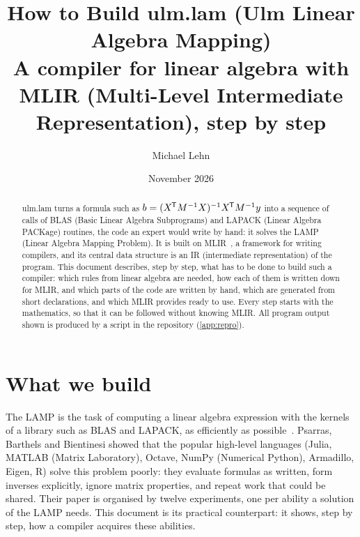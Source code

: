 \documentclass[11pt,a4paper]{article}
\title{How to Build ulm.lam (Ulm Linear Algebra Mapping)\\[0.3ex]
  \large A compiler for linear algebra with MLIR (Multi-Level Intermediate
  Representation), step by step}
\author{Michael Lehn}
\date{November 2026}
\newcommand{\T}{^{\mkern-1.5mu\mathsf{T}}}
\newcommand{\inv}{^{-1}}
\begin{document}
\maketitle

\begin{abstract}
\noindent
ulm.lam turns a formula such as
\(b=(X\T M\inv X)\inv X\T M\inv y\) into a sequence of calls of BLAS
(Basic Linear Algebra Subprograms) and LAPACK (Linear Algebra PACKage)
routines, the code an expert would write by hand: it solves the LAMP
(Linear Algebra Mapping Problem). It is built on MLIR~\cite{mlir}, a framework for
writing compilers, and its central data structure is an IR (intermediate
representation) of the program. This document describes, step by step, what has to be done to
build such a compiler: which rules from linear algebra are needed, how each
of them is written down for MLIR, and which parts of the code are written by
hand, which are generated from short declarations, and which MLIR provides
ready to use. Every step starts with the mathematics, so that it can be
followed without knowing MLIR. All program output shown is produced by a
script in the repository (\cref{app:repro}).
\end{abstract}

\tableofcontents

\section*{What we build}
\label{sec:intro}

The LAMP is the task of computing a
linear algebra expression with the kernels of a library such as BLAS and
LAPACK, as efficiently as possible~\cite{lamp}. Psarras, Barthels and
Bientinesi showed that the popular high-level languages (Julia, MATLAB
(Matrix Laboratory), Octave, NumPy (Numerical Python), Armadillo, Eigen,
R) solve
this problem poorly: they evaluate formulas as written, form inverses
explicitly, ignore matrix properties, and repeat work that could be shared.
Their paper is organised by twelve experiments, one per ability a solution
of the LAMP needs. This document is its practical counterpart: it shows,
step by step, how a compiler acquires these abilities.
\end{document}
